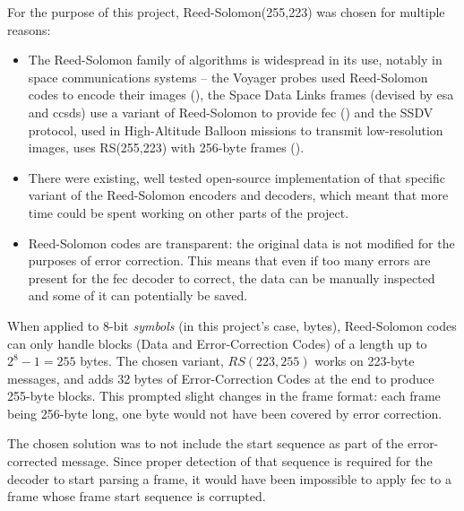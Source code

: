 
For the purpose of this project, Reed-Solomon(255,223) was chosen for multiple
reasons:

\begin{itemize}
    
\item The Reed-Solomon family of algorithms is widespread in its use, notably
in space communications systems – the Voyager probes used Reed-Solomon codes to
encode their images (\cite{Wicker1994}), the Space Data Links frames (devised
by \acrshort{esa} and \acrshort{ccsds}) use a variant of Reed-Solomon to
provide \acrshort{fec} (\cite{EuropeanCooperationforSpaceStandardization2010})
and the SSDV protocol, used in High-Altitude Balloon missions to transmit
low-resolution images, uses RS(255,223) with 256-byte frames (\cite{UKHAS2016}).

\item There were existing, well tested open-source implementation of that
specific variant of the Reed-Solomon encoders and decoders, which meant that
more time could be spent working on other parts of the project.


\item Reed-Solomon codes are transparent: the original data is not modified for
the purposes of error correction. This means that even if too many errors are
present for the \acrshort{fec} decoder to correct, the data can be manually
inspected and some of it can potentially be saved.
    
\end{itemize}

When applied to 8-bit \textit{symbols} (in this project's case, bytes),
Reed-Solomon codes can only handle blocks (Data and Error-Correction Codes) of
a length up to \(2^{8}-1 = 255\) bytes. The chosen variant, \(RS(223,255)\)
works on 223-byte messages, and adds 32 bytes of Error-Correction Codes at the
end to produce 255-byte blocks. This prompted slight changes in the frame
format: each frame being 256-byte long, one byte would not have been covered
by error correction.

The chosen solution was to not include the start sequence as part of the
error-corrected message. Since proper detection of that sequence is required
for the decoder to start parsing a frame, it would have been impossible to apply
\acrshort{fec} to a frame whose frame start sequence is corrupted.

